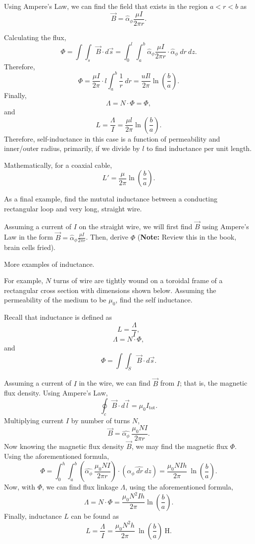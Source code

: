 \documentclass{article}
\begin{document}
Using Ampere's Law, we can find the field that exists in the region \(a < r < b\) as 
\[
  \vec{B} = \hat{\alpha}_\phi \frac{\mu I}{2 \pi r}.
\]

Calculating the flux, 
\[
  \Phi = \int \int_s \vec{B} \cdot d \vec{s} = \int_0^l \int_a^b \hat{\alpha}_\phi \frac{\mu I}{2 \pi r} \cdot \hat{\alpha}_\phi \ dr \ dz.
\]
Therefore, 
\[
	\Phi = \frac{\mu I}{2 \pi} \cdot l \int_a^b \frac{1}{r} \ dr = \frac{u I l}{2 \pi} \ln{(\frac{b}{a})}.
\]
Finally, 
\[
  \Lambda = N \cdot \Phi = \Phi,
\]
and 
\[
	L = \frac{\Lambda}{I} = \frac{\mu l}{2 \pi} \ln{(\frac{b}{a})}.
\]
Therefore, self-inductance in this case is a function of permeability and inner/outer radius, primarily, if we divide by \(l\) to find inductance per unit length.

Mathematically, for a coaxial cable,
\[
	L' = \frac{\mu}{2 \pi} \ln{(\frac{b}{a})}.
\]

As a final example, find the mututal inductance between a conducting rectangular loop and very long, straight wire.

Assuming a current of \(I\) on the straight wire, we will first find \(\vec{B}\) using Ampere's Law in the form \(\vec{B} = \hat{\alpha}_\phi \frac{\mu I}{2 \pi r}\). Then, derive \(\Phi\) (\textbf{Note:} Review this in the book, brain cells fried).

More examples of inductance.

For example, \(N\) turns of wire are tightly wound on a toroidal frame of a rectangular cross section with dimensions shown below. Assuming the permeability of the medium to be \(\mu_0\), find the self inductance.

Recall that inductance is defined as 
\[
  L = \frac{\Lambda}{I},
\]
\[
	\Lambda = N \cdot \Phi,
\]
and 
\[
  \Phi = \int \int_S \vec{B} \cdot d \vec{s}.
\]

Assuming a current of \(I\) in the wire, we can find \(\vec{B}\) from \(I\); that is, the magnetic flux density. Using Ampere's Law,
\[
	\oint_c \vec{B} \cdot d \vec{l} = \mu_0 I_{\mathrm{tot}}.
\]
Multiplying current \(I\) by number of turns \(N\), 
\[
  \vec{B} = \hat{\alpha_\phi} \ \frac{\mu_0 N I}{2 \pi r}.
\]
Now knowing the magnetic flux density \(\vec{B}\), we may find the magnetic flux \(\Phi\). Using the aforementioned formula, 
\[
	\Phi = \int_{0}^{h} \int_{a}^{b} (\hat{\alpha_\phi} \ \frac{\mu_0 N I}{2\pi r}) \cdot (\hat{\alpha_\phi \ dr \ dz}) = \frac{\mu_0 N I h}{2\pi} \ \ln({\frac{b}{a}}).
\]
Now, with \(\Phi\), we can find flux linkage \(\Lambda\), using the aforementioned formula,
\[
	\Lambda = N \cdot \Phi = \frac{\mu_0 N^2 I h}{2\pi} \ln{(\frac{b}{a})}.
\]
Finally, inductance \(L\) can be found as
\[
	L = \frac{\Lambda}{I} = \frac{\mu_0 N^2 h}{2\pi} \ \ln{(\frac{b}{a})} \ \mathrm{H}.
\]
\end{document}
